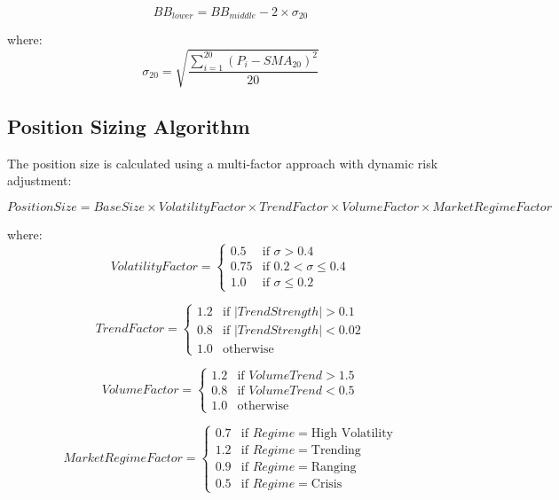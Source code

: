 \documentclass[conference]{IEEEtran}
\begin{document}
\begin{equation}
BB_{lower} = BB_{middle} - 2 \times \sigma_{20}
\end{equation}

where:
\begin{equation}
\sigma_{20} = \sqrt{\frac{\sum_{i=1}^{20} (P_i - SMA_{20})^2}{20}}
\end{equation}

\subsection{Position Sizing Algorithm}
The position size is calculated using a multi-factor approach with dynamic risk adjustment:

\begin{equation}
PositionSize = BaseSize \times VolatilityFactor \times TrendFactor \times VolumeFactor \times MarketRegimeFactor
\end{equation}

where:
\begin{equation}
VolatilityFactor = \begin{cases}
0.5 & \text{if } \sigma > 0.4 \\
0.75 & \text{if } 0.2 < \sigma \leq 0.4 \\
1.0 & \text{if } \sigma \leq 0.2
\end{cases}
\end{equation}

\begin{equation}
TrendFactor = \begin{cases}
1.2 & \text{if } |TrendStrength| > 0.1 \\
0.8 & \text{if } |TrendStrength| < 0.02 \\
1.0 & \text{otherwise}
\end{cases}
\end{equation}

\begin{equation}
VolumeFactor = \begin{cases}
1.2 & \text{if } VolumeTrend > 1.5 \\
0.8 & \text{if } VolumeTrend < 0.5 \\
1.0 & \text{otherwise}
\end{cases}
\end{equation}

\begin{equation}
MarketRegimeFactor = \begin{cases}
0.7 & \text{if } Regime = \text{High Volatility} \\
1.2 & \text{if } Regime = \text{Trending} \\
0.9 & \text{if } Regime = \text{Ranging} \\
0.5 & \text{if } Regime = \text{Crisis}
\end{cases}
\end{equation}
\end{document}
